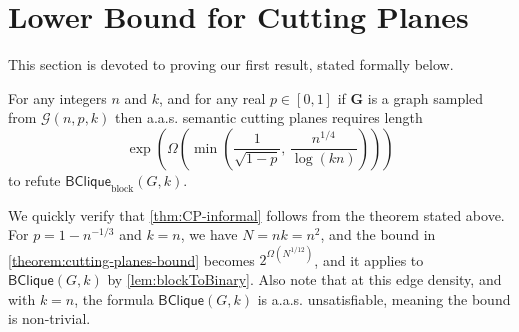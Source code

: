 \documentclass[10pt,a4paper]{article}
\makeatletter
\theoremstyle{definition}
\theoremstyle{remark}
\theoremstyle{example}
\theoremstyle{plain}
\newcommand{\calG}{\mathcal{G}}
\newcommand{\binClique}[2]{\mathsf{BClique}({#1}, {#2})}
\newcommand{\binCliqueGk}{\binClique{G}{k}}
\newcommand{\binCliqueBlock}[2]{\mathsf{BClique}_{\textrm{block}}({#1}, {#2})}
\newcommand{\binCliqueBlockGk}{\binCliqueBlock{G}{k}}
\newcommand{\graphSize}{N}
\newcommand{\aas}{a.a.s.\@\xspace}
\makeatother
\begin{document}
\section{Lower Bound for Cutting Planes} \label{sec:binCliqueDagCP}

\newcommand{\protocol}{\Pi}
\newcommand{\bw}{\mathsf{bw}}


This section is devoted to proving our first result, stated formally below.

\begin{theorem}
    For any  
    integers $n$ and $k$, and for any real $p \in [0,1]$
    if $\bm G$ is a graph sampled from $\calG(n,p,k)$ then \aas semantic cutting planes requires length 
    \begin{equation*}
        \exp\left({\Omega\left({\min\left(
    \frac{1}{\sqrt{1-p}},
    \,
    \frac{n^{1/4}}{\log(kn)}\right)}\right)}\right)
    \end{equation*}
    to refute $\binCliqueBlockGk$.%
    \label{theorem:cutting-planes-bound}
\end{theorem}

We quickly verify that \autoref{thm:CP-informal} follows from the theorem stated above. For $p=1-n^{-1/3}$ and $k = n$, we have $\graphSize=nk=n^2$, and the bound in \autoref{theorem:cutting-planes-bound} becomes $2^{\Omega(\graphSize^{1/12})}$, 
   and it applies to $\binCliqueGk$ by \autoref{lem:blockToBinary}. Also note that at this edge density, and with $k=n$, the formula $\binCliqueGk$ is \aas unsatisfiable, meaning the bound is non-trivial. 
\end{document}
